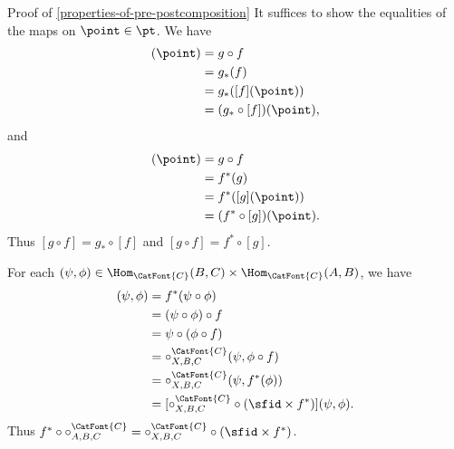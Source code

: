 \begin{Proof}{Proof of \cref{properties-of-pre-postcomposition}}
    It suffices to show the equalities of the maps on $\point\in\pt$. We have
    \begin{align*}
        [g\circ f](\point) &= g\circ f\\
                           &= g_{*}(f)\\
                           &= g_{*}([f](\point))\\
                           &= (g_{*}\circ[f])(\point),
    \end{align*}
    and
    \begin{align*}
        [g\circ f](\point) &= g\circ f\\
                           &= f^{*}(g)\\
                           &= f^{*}([g](\point))\\
                           &= (f^{*}\circ[g])(\point).%
    \end{align*}
    Thus $[g\circ f]=g_{*}\circ[f]$ and $[g\circ f]=f^{*}\circ[g]$.

    For each $(\psi,\phi)\in\Hom_{\CatFont{C}}(B,C)\times\Hom_{\CatFont{C}}(A,B)$, we have
    \begin{align*}
        [f^{*}\circ\mathord{\circ^{\CatFont{C}}_{A,B,C}}](\psi,\phi) &= f^{*}(\psi\circ\phi)\\
                                                                     &= (\psi\circ\phi)\circ f\\
                                                                     &= \psi\circ(\phi\circ f)\\
                                                                     &= \mathord{\circ^{\CatFont{C}}_{X,B,C}}(\psi,\phi\circ f)\\
                                                                     &= \mathord{\circ^{\CatFont{C}}_{X,B,C}}(\psi,f^{*}(\phi))\\
                                                                     &= [\mathord{\circ^{\CatFont{C}}_{X,B,C}}\circ(\sfid\times f^{*})](\psi,\phi).
    \end{align*}
    Thus $f^{*}\circ\mathord{\circ^{\CatFont{C}}_{A,B,C}}=\mathord{\circ^{\CatFont{C}}_{X,B,C}}\circ(\sfid\times f^{*})$.


\end{Proof}
